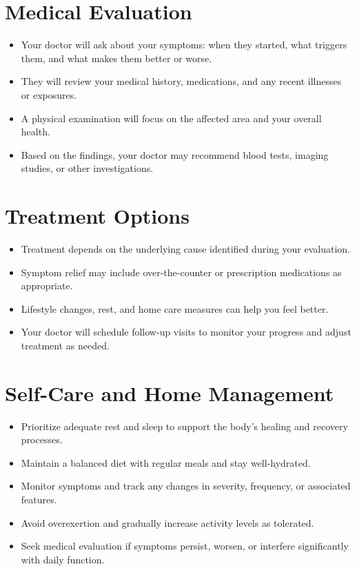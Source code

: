 \section*{Medical Evaluation}
\begin{itemize}
  \item Your doctor will ask about your symptoms: when they started, what triggers them, and what makes them better or worse.
  \item They will review your medical history, medications, and any recent illnesses or exposures.
  \item A physical examination will focus on the affected area and your overall health.
  \item Based on the findings, your doctor may recommend blood tests, imaging studies, or other investigations.
\end{itemize}

\section*{Treatment Options}
\begin{itemize}
  \item Treatment depends on the underlying cause identified during your evaluation.
  \item Symptom relief may include over-the-counter or prescription medications as appropriate.
  \item Lifestyle changes, rest, and home care measures can help you feel better.
  \item Your doctor will schedule follow-up visits to monitor your progress and adjust treatment as needed.
\end{itemize}

\section*{Self-Care and Home Management}
\begin{itemize}
  \item Prioritize adequate rest and sleep to support the body's healing and recovery processes.
  \item Maintain a balanced diet with regular meals and stay well-hydrated.
  \item Monitor symptoms and track any changes in severity, frequency, or associated features.
  \item Avoid overexertion and gradually increase activity levels as tolerated.
  \item Seek medical evaluation if symptoms persist, worsen, or interfere significantly with daily function.
\end{itemize}

